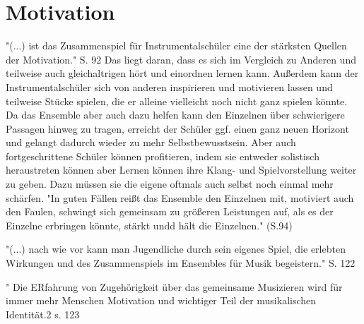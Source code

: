 \section{Motivation}

"(...) ist das Zusammenspiel für Instrumentalschüler eine der stärksten Quellen
der Motivation." S. 92 Das liegt daran, dass es sich im Vergleich zu Anderen und
teilweise auch gleichaltrigen hört und einordnen lernen kann. Außerdem kann der Instrumentalschüler
sich von anderen inspirieren und motivieren lassen und teilweise Stücke spielen,
die er alleine vielleicht noch nicht ganz spielen könnte. Da das Ensemble aber
auch dazu helfen kann den Einzelnen über schwierigere Passagen hinweg zu tragen,
erreicht der Schüler ggf. einen ganz neuen Horizont und gelangt dadurch wieder
zu mehr Selbstbewusstsein. Aber auch fortgeschrittene Schüler können
profitieren, indem sie entweder solistisch heraustreten können aber Lernen
können ihre Klang- und Spielvorstellung weiter zu geben. Dazu müssen sie die
eigene oftmals auch selbst noch einmal mehr schärfen. "In guten Fällen reißt das
Ensemble den Einzelnen mit, motiviert auch den Faulen, schwingt sich gemeinsam
zu größeren Leistungen auf, als es der Einzelne erbringen könnte, stärkt undd
hält die Einzelnen." (S.94)


"(...) nach wie vor kann man Jugendliche durch sein eigenes Spiel, die erlebten
Wirkungen und des Zusammenspiels im Ensembles für Musik begeistern." S. 122


" Die ERfahrung von Zugehörigkeit über das gemeinsame Musizieren wird für immer
mehr Menschen Motivation und wichtiger Teil der musikalischen Identität.2 s. 123
